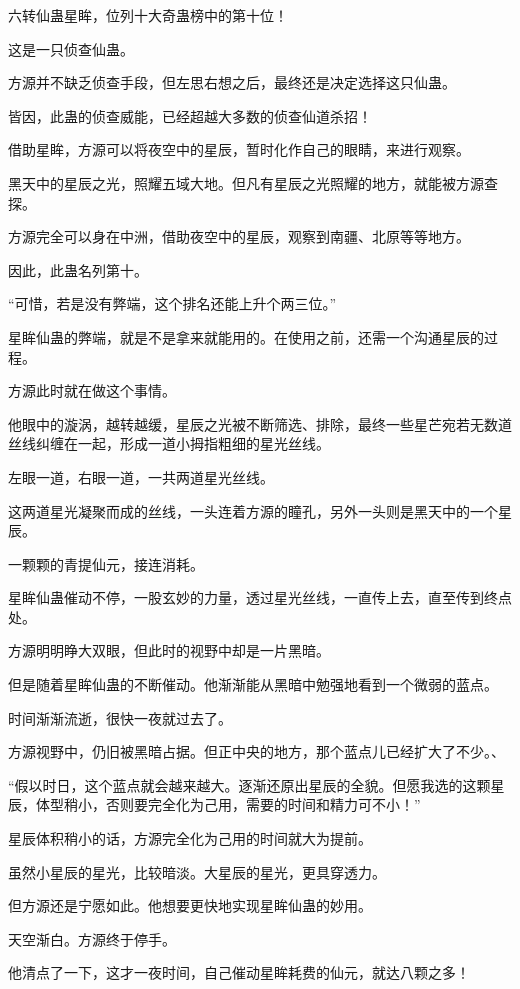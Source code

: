 \begin{this_body}
六转仙蛊星眸，位列十大奇蛊榜中的第十位！

这是一只侦查仙蛊。

方源并不缺乏侦查手段，但左思右想之后，最终还是决定选择这只仙蛊。

皆因，此蛊的侦查威能，已经超越大多数的侦查仙道杀招！

借助星眸，方源可以将夜空中的星辰，暂时化作自己的眼睛，来进行观察。

黑天中的星辰之光，照耀五域大地。但凡有星辰之光照耀的地方，就能被方源查探。

方源完全可以身在中洲，借助夜空中的星辰，观察到南疆、北原等等地方。

因此，此蛊名列第十。

“可惜，若是没有弊端，这个排名还能上升个两三位。”

星眸仙蛊的弊端，就是不是拿来就能用的。在使用之前，还需一个沟通星辰的过程。

方源此时就在做这个事情。

他眼中的漩涡，越转越缓，星辰之光被不断筛选、排除，最终一些星芒宛若无数道丝线纠缠在一起，形成一道小拇指粗细的星光丝线。

左眼一道，右眼一道，一共两道星光丝线。

这两道星光凝聚而成的丝线，一头连着方源的瞳孔，另外一头则是黑天中的一个星辰。

一颗颗的青提仙元，接连消耗。

星眸仙蛊催动不停，一股玄妙的力量，透过星光丝线，一直传上去，直至传到终点处。

方源明明睁大双眼，但此时的视野中却是一片黑暗。

但是随着星眸仙蛊的不断催动。他渐渐能从黑暗中勉强地看到一个微弱的蓝点。

时间渐渐流逝，很快一夜就过去了。

方源视野中，仍旧被黑暗占据。但正中央的地方，那个蓝点儿已经扩大了不少。、

“假以时日，这个蓝点就会越来越大。逐渐还原出星辰的全貌。但愿我选的这颗星辰，体型稍小，否则要完全化为己用，需要的时间和精力可不小！”

星辰体积稍小的话，方源完全化为己用的时间就大为提前。

虽然小星辰的星光，比较暗淡。大星辰的星光，更具穿透力。

但方源还是宁愿如此。他想要更快地实现星眸仙蛊的妙用。

天空渐白。方源终于停手。

他清点了一下，这才一夜时间，自己催动星眸耗费的仙元，就达八颗之多！


\end{this_body}
